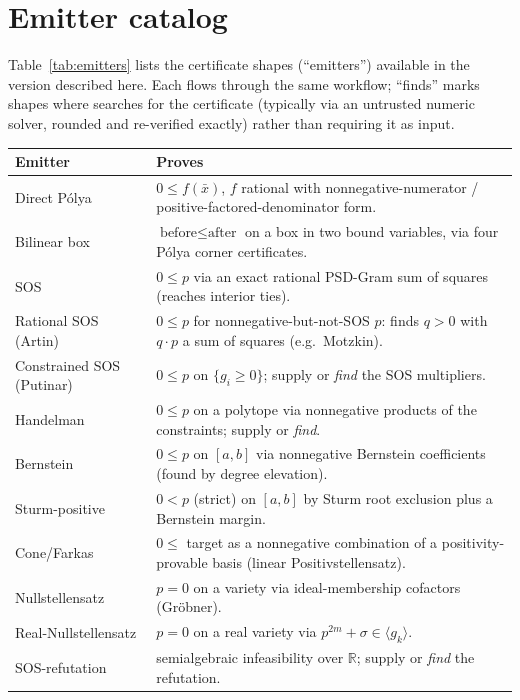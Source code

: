 \section{Emitter catalog}
\label{app:emitters}

Table~\ref{tab:emitters} lists the certificate shapes (``emitters'') available in
the version described here. Each flows through the same
 workflow; ``finds'' marks
shapes where \Telperion{} searches for the certificate (typically via an untrusted
numeric solver, rounded and re-verified exactly) rather than requiring it as input.

\begin{longtable}{@{}p{}p{}@{}}
\toprule
\textbf{Emitter} & \textbf{Proves} \\
\midrule
\endhead
Direct P\'olya & $0 \le f(\bar x)$, $f$ rational with nonnegative-numerator /
positive-factored-denominator form. \\
Bilinear box & $\text{before} \le \text{after}$ on a box in two bound variables,
via four P\'olya corner certificates. \\
SOS & $0 \le p$ via an exact rational PSD-Gram sum of squares (reaches interior
ties). \\
Rational SOS (Artin) & $0 \le p$ for nonnegative-but-not-SOS $p$: finds $q > 0$
with $q\cdot p$ a sum of squares (e.g.\ Motzkin). \\
Constrained SOS (Putinar) & $0 \le p$ on $\{g_i \ge 0\}$; supply or \emph{find} the
SOS multipliers. \\
Handelman & $0 \le p$ on a polytope via nonnegative products of the constraints;
supply or \emph{find}. \\
Bernstein & $0 \le p$ on $[a,b]$ via nonnegative Bernstein coefficients (found by
degree elevation). \\
Sturm-positive & $0 < p$ (strict) on $[a,b]$ by Sturm root exclusion plus a
Bernstein margin. \\
Cone/Farkas & $0 \le$ target as a nonnegative combination of a positivity-provable
basis (linear Positivstellensatz). \\
Nullstellensatz & $p = 0$ on a variety via ideal-membership cofactors (Gr\"obner). \\
Real-Nullstellensatz & $p = 0$ on a real variety via $p^{2m} + \sigma \in \langle
g_k\rangle$. \\
SOS-refutation & semialgebraic infeasibility over $\mathbb{R}$; supply or
\emph{find} the refutation. \\

\end{longtable}
